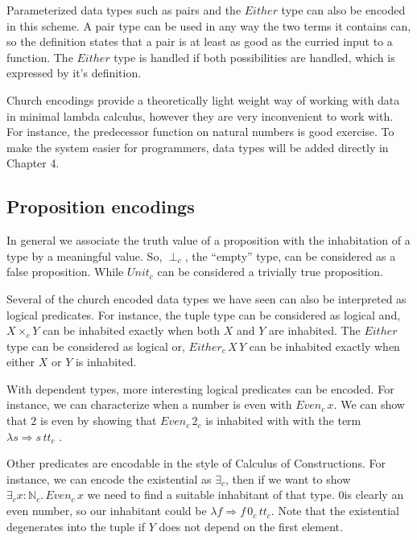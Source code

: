 Parameterized data types such as pairs and the $Either$ type can also be encoded in this scheme.
A pair type can be used in any way the two terms it contains can, so the definition states that a pair is at least as good as the curried input to a function.
The $Either$ type is handled if both possibilities are handled, which is expressed by it's definition.



Church encodings provide a theoretically light weight way of working with data in minimal lambda calculus, however they are very inconvenient to work with.
For instance, the predecessor function on natural numbers is good exercise.
To make the system easier for programmers, data types will be added directly in Chapter 4.

\subsection{Proposition encodings}

In general we associate the truth value of a proposition with the inhabitation of a type by a meaningful value.
So, $\perp_{c}$, the ``empty'' type, can be considered as a false proposition.
While $Unit_{c}$ can be considered a trivially true proposition.

Several of the church encoded data types we have seen can also be interpreted as logical predicates.
For instance, the tuple type can be considered as logical and, $X\times_{c}Y$ can be inhabited exactly when both $X$ and $Y$ are inhabited.
The $Either$ type can be considered as logical or, $Either_{c}\,X\,Y$ can be inhabited exactly when either $X$ or $Y$ is inhabited.

With dependent types, more interesting logical predicates can be encoded.
For instance, we can characterize when a number is even with $Even_{c}\,x$.
We can show that $2$ is even by showing that $Even_{c}\,2_{c}$ is inhabited with with the term $\lambda s\Rightarrow s\,tt_{c}$ .

Other predicates are encodable in the style of Calculus of Constructions\cite{10.1016/0890-5401(88)90005-3}.
For instance, we can encode the existential as $\exists_{c}$, then if we want to show $\exists_{c}x:\mathbb{N}_{c}.\,Even_{c}\,x$ we need to find a suitable inhabitant of that type.
$0$is clearly an even number, so our inhabitant could be $\lambda f\Rightarrow f\,0_{c}\,tt_{c}$.
Note that the existential degenerates into the tuple if $Y$ does not depend on the first element.


